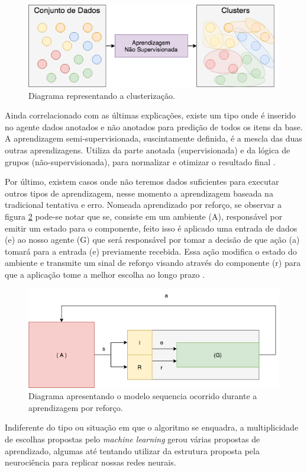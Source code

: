 \begin{figure}[H]
    \centering
    \includegraphics[width=.8\textwidth]{imagens/unsupervised.png}
    \caption{Diagrama representando a clusterização.}
    \label{fig:unsupervised}
\end{figure}

Ainda correlacionado com as últimas explicações, existe um tipo onde é inserido no agente dados anotados e não anotados para predição de todos os itens da base. A aprendizagem semi-supervisionada, suscintamente definida, é a mescla das duas outras aprendizagens. Utiliza da parte anotada (supervisionada) e da lógica de grupos (não-supervisionada), para normalizar e otimizar o resultado final \cite[7]{mohri2012foundations}.

Por último, existem casos onde não teremos dados suficientes para executar outros tipos de aprendizagem, nesse momento a aprendizagem baseada na tradicional tentativa e erro. Nomeada aprendizado por reforço, se observar a figura \ref{fig:reinforcement} pode-se notar que se, consiste em um ambiente (A), responsável por emitir um estado para o componente, feito isso é aplicado uma entrada de dados (e) ao nosso agente (G) que será responsável por tomar a decisão de que ação (a) tomará para a entrada (e) previamente recebida. Essa ação modifica o estado do ambiente e transmite um sinal de reforço visando através do componente (r) para que a aplicação tome a melhor escolha ao longo prazo \cite{kaelbling1996reinforcement, russell2003artificial}.

\begin{figure}[H]
    \centering
    \includegraphics[width=.8\textwidth]{imagens/reinforcement.png}
    \caption{Diagrama apresentando o modelo sequencia ocorrido durante a aprendizagem por reforço.}
    \label{fig:reinforcement}
\end{figure}

Indiferente do tipo ou situação em que o algoritmo se enquadra, a multiplicidade de escolhas propostas pelo \textit{machine learning} gerou várias propostas de aprendizado, algumas até tentando utilizar da estrutura proposta pela neurociência para replicar nossas redes neurais.
